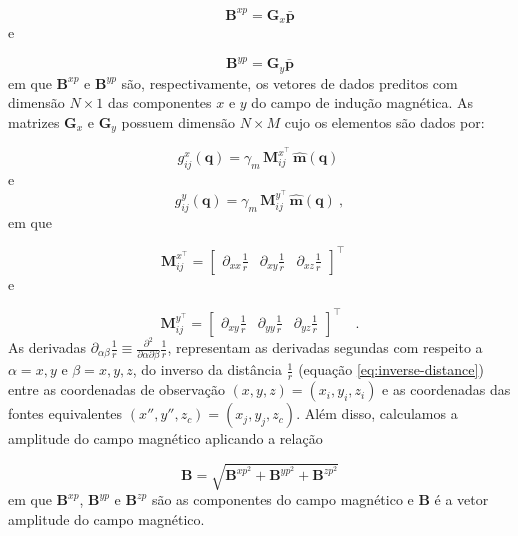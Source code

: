 \begin{equation}
\mathbf{B}^{xp}  = \mathbf{G}_{x} \bar{\mathbf{p}}
\label{eq:pred_vec_x}
\end{equation}
e

\begin{equation}
\mathbf{B}^{yp}  = \mathbf{G}_{y} \bar{\mathbf{p}}
\label{eq:pred_vec_y}
\end{equation}
em que $\mathbf{B}^{xp}$ e $\mathbf{B}^{yp}$ são, respectivamente, os vetores de dados preditos com dimensão $N \times 1$ das componentes $x$ e $y$ do campo de indução magnética. As matrizes $\mathbf{G}_{x}$ e $\mathbf{G}_{y}$ possuem dimensão $N \times M $ cujo os elementos são dados por: 

\begin{equation}
g_{ij}^{x}(\mathbf{q})  = \gamma_m \, \mathbf{M}_{ij}^{x^\top} \, \hat{\mathbf{m}}(\mathbf{q}) \: 
\label{eq:g_ij-x}
\end{equation}
e 
\begin{equation}
g_{ij}^{y}(\mathbf{q})  = \gamma_m \, \mathbf{M}_{ij}^{y^\top} \, \hat{\mathbf{m}}(\mathbf{q}) \: ,
\label{eq:g_ij-y}
\end{equation}
em que 

\begin{equation}
\mathbf{M}_{ij}^{x^\top} = \begin{bmatrix}
\partial_{xx} \frac{1}{r} & 
\partial_{xy} \frac{1}{r} &
\partial_{xz} \frac{1}{r}
\end{bmatrix}^\top \quad 
\label{eq:Mij-matrix-z}
\end{equation}
e 

\begin{equation}
\mathbf{M}_{ij}^{y^\top} = \begin{bmatrix}
\partial_{xy} \frac{1}{r} & 
\partial_{yy} \frac{1}{r} &
\partial_{yz} \frac{1}{r}
\end{bmatrix}^\top \quad .
\label{eq:Mij-matrix-z}
\end{equation}
As derivadas $\partial_{\alpha\beta} \frac{1}{r} \equiv \frac{\partial^{2}}{\partial \alpha \partial \beta} \frac{1}{r}$, representam as derivadas segundas com respeito a $\alpha = x, y$ e $\beta = x, y, z$, do inverso da distância $\frac{1}{r}$ (equação \ref{eq:inverse-distance}) entre as coordenadas de observação $(x, y, z) = (x_{i}, y_{i}, z_{i})$ e as coordenadas das fontes equivalentes $(x'', y'', z_{c}) = (x_{j}, y_{j}, z_{c})$. Além disso, calculamos a amplitude do campo magnético aplicando a relação

\begin{equation}
\mathbf{B} = \sqrt{ \mathbf{B}^{{xp}^2} + \mathbf{B}^{{yp}^2} + \mathbf{B}^{{zp}^2}}   
\label{eq:amplitude_field}
\end{equation}
em que $\mathbf{B}^{xp}$, $\mathbf{B}^{yp}$ e $\mathbf{B}^{zp}$ são as componentes do campo magnético e $\mathbf{B}$ é a vetor amplitude do campo magnético. 

